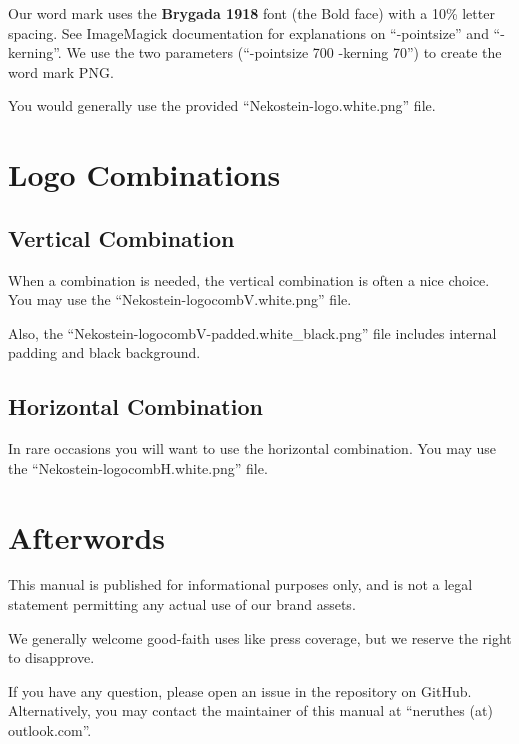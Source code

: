\documentclass[a4paper,11pt]{article}
\begin{document}
Our word mark uses the \textbf{Brygada 1918} font (the Bold face) with a 10\% letter spacing.
See ImageMagick documentation for explanations on ``-pointsize'' and ``-kerning''.
We use the two parameters (``-pointsize 700 -kerning 70'') to create the word mark PNG.

You would generally use the provided ``Nekostein-logo.white.png'' file.






\section{Logo Combinations}

\subsection{Vertical Combination}

When a combination is needed, the vertical combination is often a nice choice.
You may use the ``Nekostein-logocombV.white.png'' file.

Also, the ``Nekostein-logocombV-padded.white\_black.png'' file includes internal padding and black background.

\subsection{Horizontal Combination}

In rare occasions you will want to use the horizontal combination.
You may use the ``Nekostein-logocombH.white.png'' file.








\section*{Afterwords}
This manual is published for informational purposes only,
and is not a legal statement permitting any actual use of our brand assets.

We generally welcome good-faith uses like press coverage,
but we reserve the right to disapprove.

If you have any question, please open an issue in the repository on GitHub.
Alternatively, you may contact the maintainer of this manual at ``neruthes (at) outlook.com''.
\end{document}
